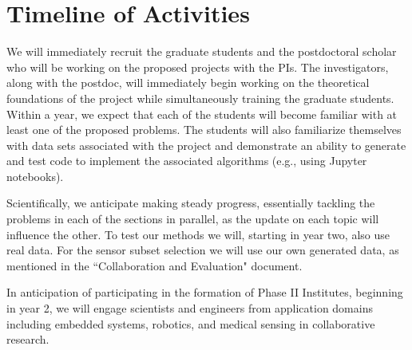 \section{Timeline of Activities}
We will immediately recruit the graduate students and the postdoctoral scholar who will be working on the proposed projects with the PIs. The investigators, along with the postdoc, will immediately begin working on the theoretical foundations of the project while simultaneously training the graduate students. Within a year, we expect that each of the students will become familiar with at least one of the proposed problems. The students will also familiarize themselves with data sets associated with the project and demonstrate an ability to generate and test code to implement the associated algorithms (e.g., using Jupyter notebooks). 

Scientifically, we anticipate making steady progress, essentially tackling the problems in each of the sections in parallel, as the update on each topic will influence the other. To test our methods we will, starting in year two, also use real data. For the sensor subset selection we will use our own generated data, as mentioned in the ``Collaboration and Evaluation" document. 

In anticipation of participating in the formation of Phase II Institutes, beginning in year 2, we will  engage scientists and engineers from application domains including embedded systems, robotics, and medical sensing in collaborative research. 